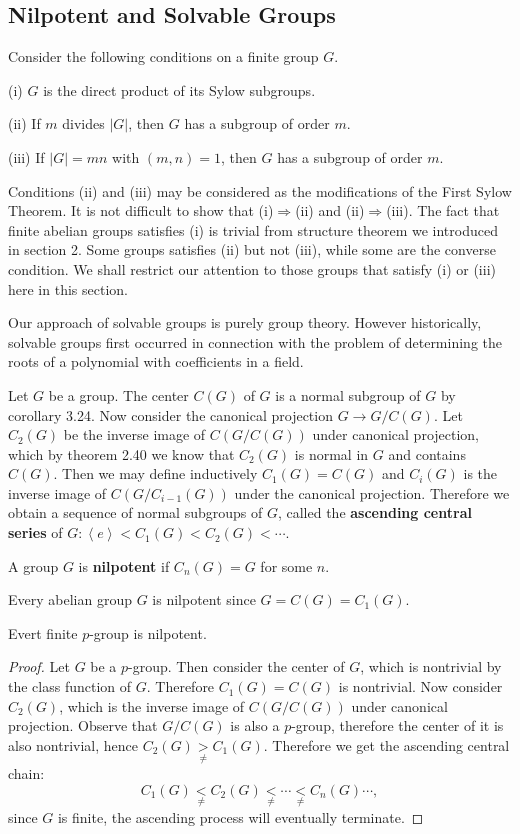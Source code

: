 \subsection{Nilpotent and Solvable Groups}
Consider the following conditions on a finite group $G$.\par
(i) $G$ is the direct  product of its Sylow subgroups.\par
(ii) If $m$ divides $|G|$, then $G$ has a subgroup of order $m$.\par
(iii) If $|G|=mn$ with $(m,n)=1$, then $G$ has a subgroup of order $m$.\par
Conditions (ii) and (iii) may be considered as the modifications of the First Sylow Theorem. It is not difficult to show that (i)$\Rightarrow$(ii) and (ii)$\Rightarrow$(iii). The fact that finite abelian groups satisfies (i) is trivial from structure theorem we introduced in section 2. Some groups satisfies (ii) but not (iii), while some are the converse condition. We shall restrict our attention to those groups that satisfy (i) or (iii) here in this section.\par
Our approach of solvable groups is purely group theory. However historically, solvable groups first occurred in connection with the problem of determining the roots of a polynomial with coefficients in a field.\par
Let $G$ be a group. The center $C(G)$ of $G$ is a normal subgroup of $G$ by corollary 3.24. Now consider the canonical projection $G\to G/C(G)$. Let $C_2(G)$ be the inverse image of $C(G/C(G))$ under canonical projection, which by theorem 2.40 we know that $C_2(G)$ is normal in $G$ and contains $C(G)$. Then we may define inductively $C_1(G)=C(G)$ and $C_i(G)$ is the inverse image of $C(G/C_{i-1}(G))$ under the canonical projection. Therefore we obtain a sequence of normal subgroups of $G$, called the \textbf{ascending central series} of $G:\left<e\right><C_1(G)<C_2(G)<\cdots$.
\begin{definition}
A group $G$ is \textbf{nilpotent} if $C_n(G)=G$ for some $n$.
\end{definition}
Every abelian group $G$ is nilpotent since $G=C(G)=C_1(G)$.
\begin{theorem}
Evert finite $p$-group is nilpotent.
\end{theorem}
\begin{proof}
Let $G$ be a $p$-group. Then consider the center of $G$, which is nontrivial by the class function of $G$. Therefore $C_1(G)=C(G)$ is nontrivial. Now consider $C_2(G)$, which is the inverse image of $C(G/C(G))$ under canonical projection. Observe that $G/C(G)$ is also a $p$-group, therefore the center of it is also nontrivial, hence $C_2\left( G \right) \underset{\ne}{>}C_1\left( G \right) $. Therefore we get the ascending central chain:
$$
C_1\left( G \right) \underset{\ne}{<}C_2\left( G \right) \underset{\ne}{<}\cdots \underset{\ne}{<}C_n\left( G \right) \cdots ,
$$
since $G$ is finite, the ascending process will eventually terminate.
\end{proof}

